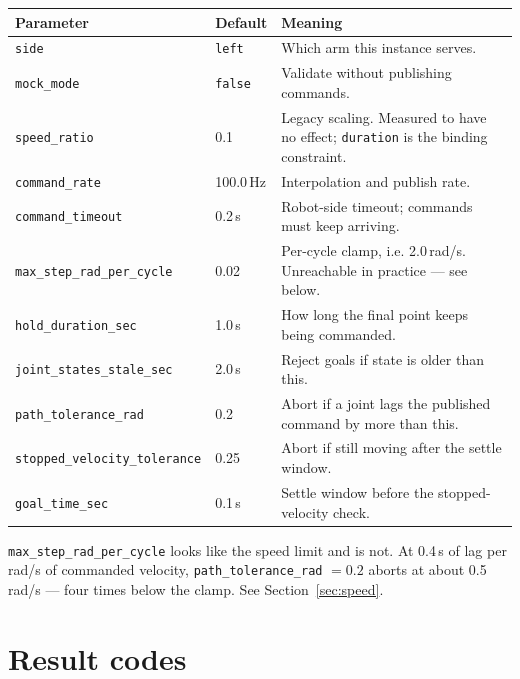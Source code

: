 \begin{table}[h]
\centering
\small
\begin{tabularx}{\linewidth}{@{}llX@{}}
\toprule
\textbf{Parameter} & \textbf{Default} & \textbf{Meaning} \\
\midrule
\texttt{side} & \texttt{left} & Which arm this instance serves. \\
\texttt{mock\_mode} & \texttt{false} & Validate without publishing commands. \\
\texttt{speed\_ratio} & 0.1 & Legacy scaling. Measured to have no effect; \texttt{duration} is the binding constraint. \\
\texttt{command\_rate} & 100.0\,Hz & Interpolation and publish rate. \\
\texttt{command\_timeout} & 0.2\,s & Robot-side timeout; commands must keep arriving. \\
\texttt{max\_step\_rad\_per\_cycle} & 0.02 & Per-cycle clamp, i.e. 2.0\,rad/s. Unreachable in practice --- see below. \\
\texttt{hold\_duration\_sec} & 1.0\,s & How long the final point keeps being commanded. \\
\texttt{joint\_states\_stale\_sec} & 2.0\,s & Reject goals if state is older than this. \\
\texttt{path\_tolerance\_rad} & 0.2 & Abort if a joint lags the published command by more than this. \\
\texttt{stopped\_velocity\_tolerance} & 0.25 & Abort if still moving after the settle window. \\
\texttt{goal\_time\_sec} & 0.1\,s & Settle window before the stopped-velocity check. \\
\bottomrule
\end{tabularx}
\end{table}

\begin{notebox}
\texttt{max\_step\_rad\_per\_cycle} looks like the speed limit and is not. At
0.4\,s of lag per rad/s of commanded velocity, \texttt{path\_tolerance\_rad}
$= 0.2$ aborts at about 0.5\,rad/s --- four times below the clamp. See
Section~\ref{sec:speed}.
\end{notebox}

\section{Result codes}


